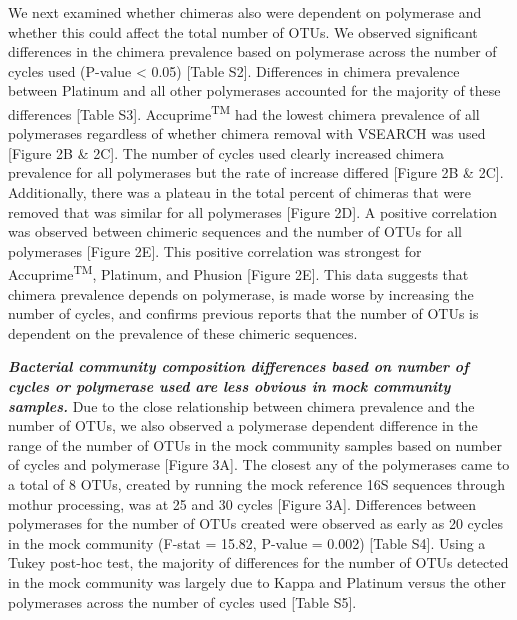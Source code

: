 \documentclass[11pt,]{article}
\begin{document}
We next examined whether chimeras also were dependent on polymerase and
whether this could affect the total number of OTUs. We observed
significant differences in the chimera prevalence based on polymerase
across the number of cycles used (P-value \textless{} 0.05) {[}Table
S2{]}. Differences in chimera prevalence between Platinum and all other
polymerases accounted for the majority of these differences {[}Table
S3{]}. Accuprime\textsuperscript{TM} had the lowest chimera prevalence
of all polymerases regardless of whether chimera removal with VSEARCH
was used {[}Figure 2B \& 2C{]}. The number of cycles used clearly
increased chimera prevalence for all polymerases but the rate of
increase differed {[}Figure 2B \& 2C{]}. Additionally, there was a
plateau in the total percent of chimeras that were removed that was
similar for all polymerases {[}Figure 2D{]}. A positive correlation was
observed between chimeric sequences and the number of OTUs for all
polymerases {[}Figure 2E{]}. This positive correlation was strongest for
Accuprime\textsuperscript{TM}, Platinum, and Phusion {[}Figure 2E{]}.
This data suggests that chimera prevalence depends on polymerase, is
made worse by increasing the number of cycles, and confirms previous
reports that the number of OTUs is dependent on the prevalence of these
chimeric sequences.

\textbf{\emph{Bacterial community composition differences based on
number of cycles or polymerase used are less obvious in mock community
samples.}} Due to the close relationship between chimera prevalence and
the number of OTUs, we also observed a polymerase dependent difference
in the range of the number of OTUs in the mock community samples based
on number of cycles and polymerase {[}Figure 3A{]}. The closest any of
the polymerases came to a total of 8 OTUs, created by running the mock
reference 16S sequences through mothur processing, was at 25 and 30
cycles {[}Figure 3A{]}. Differences between polymerases for the number
of OTUs created were observed as early as 20 cycles in the mock
community (F-stat = 15.82, P-value = 0.002) {[}Table S4{]}. Using a
Tukey post-hoc test, the majority of differences for the number of OTUs
detected in the mock community was largely due to Kappa and Platinum
versus the other polymerases across the number of cycles used {[}Table
S5{]}.
\end{document}
